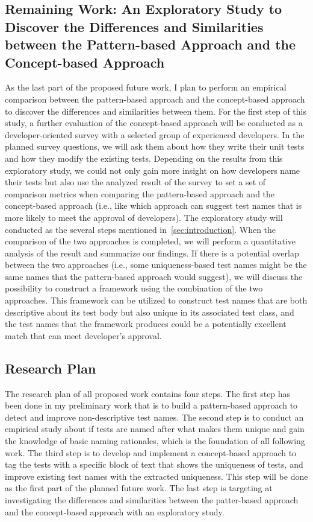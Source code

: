 \subsection{Remaining Work: An Exploratory Study to Discover the Differences and Similarities between the Pattern-based Approach and the Concept-based Approach}
\label{sec:remaining-shape}

As the last part of the proposed future work, I plan to perform an empirical comparison between the pattern-based approach and the concept-based approach to discover the differences and similarities between them.
%
For the first step of this study, a further evaluation of the concept-based approach will be conducted as a developer-oriented survey with a selected group of experienced developers.
%
In the planned survey questions, we will ask them about how they write their unit tests and how they modify the existing tests.
%
Depending on the results from this exploratory study, we could not only gain more insight on how developers name their tests but also use the analyzed result of the survey to set a set of comparison metrics when comparing the pattern-based approach and the concept-based approach (i.e., like which approach can suggest test names that is more likely to meet the approval of developers).
%
The exploratory study will conducted as the several steps mentioned in~\cref{sec:introduction}.
%
When the comparison of the two approaches is completed, we will perform a quantitative analysis of the result and summarize our findings.
%
If there is a potential overlap between the two approaches (i.e., some uniqueness-based test names might be the same names that the pattern-based approach would suggest), we will discuss the possibility to construct a framework using the combination of the two approaches.
%
This framework can be utilized to construct test names that are both descriptive about its test body but also unique in its associated test class, and the test names that the framework produces could be a potentially excellent match that can meet developer's approval.

\subsection{Research Plan}

The research plan of all proposed work contains four steps.
%
The first step has been done in my preliminary work that is to build a pattern-based approach to detect and improve non-descriptive test names.
%
The second step is to conduct an empirical study about if tests are named after what makes them unique and gain the knowledge of basic naming rationales, which is the foundation of all following work.
%
The third step is to develop and implement a concept-based approach to tag the tests with a specific block of text that shows the uniqueness of tests, and improve existing test names with the extracted uniqueness.
%
This step will be done as the first part of the planned future work.
%
The last step is targeting at investigating the differences and similarities between the patter-based approach and the concept-based approach with an exploratory study.